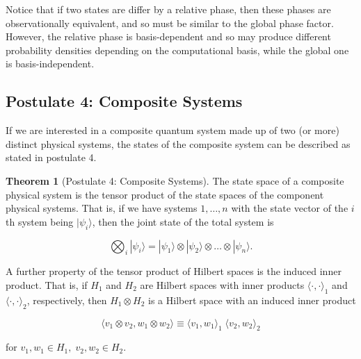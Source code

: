 \documentclass{article}
\theoremstyle{definition}
\newtheorem{theorem}{Theorem}[section]
\begin{document}
        Notice that if two states are differ by a relative phase, then these phases are observationally equivalent, and so must be similar to the global phase factor. However, the relative phase is basis-dependent and so may produce different probability densities depending on the computational basis, while the global one is basis-independent. 

  \subsection{Postulate 4: Composite Systems}

    If we are interested in a composite quantum system made up of two (or more) distinct physical systems, the states of the composite system can be described as stated in postulate 4. 

    \begin{theorem}[Postulate 4: Composite Systems]
      The state space of a composite physical system is the tensor product of the state spaces of the component physical systems. That is, if we have systems $1, \ldots, n$ with the state vector of the $i$th system being $|\psi_i \rangle$, then the joint state of the total system is

        \[\bigotimes_i |\psi_i \rangle = |\psi_1 \rangle \otimes |\psi_2 \rangle \otimes \ldots \otimes |\psi_n \rangle.\]
    \end{theorem}

    A further property of the tensor product of Hilbert spaces is the induced inner product. That is, if $H_1$ and $H_2$ are Hilbert spaces with inner products $\langle \cdot, \cdot \rangle_1$ and $\langle \cdot, \cdot \rangle_2$, respectively, then $H_1 \otimes H_2$ is a Hilbert space with an induced inner product

      \[\langle v_1 \otimes v_2 , w_1 \otimes w_2 \rangle \equiv \langle v_1, w_1\rangle_1 \; \langle v_2, w_2 \rangle_2\]

    for $v_1, w_1 \in H_1, \; v_2, w_2 \in H_2$. 
\end{document}
